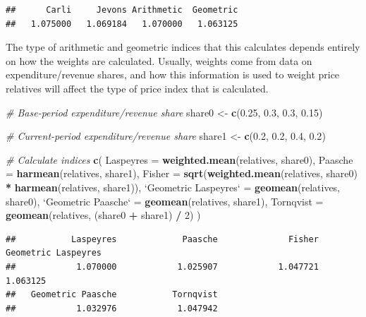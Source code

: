 \documentclass[]{article}
\newenvironment{Shaded}{\begin{snugshade}}{\end{snugshade}}
\newcommand{\CommentTok}[1]{\textcolor[rgb]{0.56,0.35,0.01}{\textit{#1}}}
\newcommand{\DataTypeTok}[1]{\textcolor[rgb]{0.13,0.29,0.53}{#1}}
\newcommand{\DecValTok}[1]{\textcolor[rgb]{0.00,0.00,0.81}{#1}}
\newcommand{\FloatTok}[1]{\textcolor[rgb]{0.00,0.00,0.81}{#1}}
\newcommand{\KeywordTok}[1]{\textcolor[rgb]{0.13,0.29,0.53}{\textbf{#1}}}
\newcommand{\NormalTok}[1]{#1}
\newcommand{\OperatorTok}[1]{\textcolor[rgb]{0.81,0.36,0.00}{\textbf{#1}}}
\newcommand{\StringTok}[1]{\textcolor[rgb]{0.31,0.60,0.02}{#1}}
\begin{document}
\begin{verbatim}
##      Carli     Jevons Arithmetic  Geometric 
##   1.075000   1.069184   1.070000   1.063125
\end{verbatim}

The type of arithmetic and geometric indices that this calculates depends entirely on how the weights are calculated. Usually, weights come from data on expenditure/revenue shares, and how this information is used to weight price relatives will affect the type of price index that is calculated.

\begin{Shaded}
\begin{Highlighting}[]
\CommentTok{# Base-period expenditure/revenue share}
\NormalTok{share0 <-}\StringTok{ }\KeywordTok{c}\NormalTok{(}\FloatTok{0.25}\NormalTok{, }\FloatTok{0.3}\NormalTok{, }\FloatTok{0.3}\NormalTok{, }\FloatTok{0.15}\NormalTok{) }

\CommentTok{# Current-period expenditure/revenue share}
\NormalTok{share1 <-}\StringTok{ }\KeywordTok{c}\NormalTok{(}\FloatTok{0.2}\NormalTok{, }\FloatTok{0.2}\NormalTok{, }\FloatTok{0.4}\NormalTok{, }\FloatTok{0.2}\NormalTok{)}

\CommentTok{# Calculate indices}
\KeywordTok{c}\NormalTok{(}
  \DataTypeTok{Laspeyres =} \KeywordTok{weighted.mean}\NormalTok{(relatives, share0),}
  \DataTypeTok{Paasche =} \KeywordTok{harmean}\NormalTok{(relatives, share1),}
  \DataTypeTok{Fisher =} \KeywordTok{sqrt}\NormalTok{(}\KeywordTok{weighted.mean}\NormalTok{(relatives, share0) }\OperatorTok{*}\StringTok{ }\KeywordTok{harmean}\NormalTok{(relatives, share1)),}
  \StringTok{`}\DataTypeTok{Geometric Laspeyres}\StringTok{`}\NormalTok{ =}\StringTok{ }\KeywordTok{geomean}\NormalTok{(relatives, share0),}
  \StringTok{`}\DataTypeTok{Geometric Paasche}\StringTok{`}\NormalTok{ =}\StringTok{ }\KeywordTok{geomean}\NormalTok{(relatives, share1),}
  \DataTypeTok{Tornqvist =} \KeywordTok{geomean}\NormalTok{(relatives, (share0 }\OperatorTok{+}\StringTok{ }\NormalTok{share1) }\OperatorTok{/}\StringTok{ }\DecValTok{2}\NormalTok{)}
\NormalTok{)}
\end{Highlighting}
\end{Shaded}

\begin{verbatim}
##           Laspeyres             Paasche              Fisher Geometric Laspeyres 
##            1.070000            1.025907            1.047721            1.063125 
##   Geometric Paasche           Tornqvist 
##            1.032976            1.047942
\end{verbatim}
\end{document}
